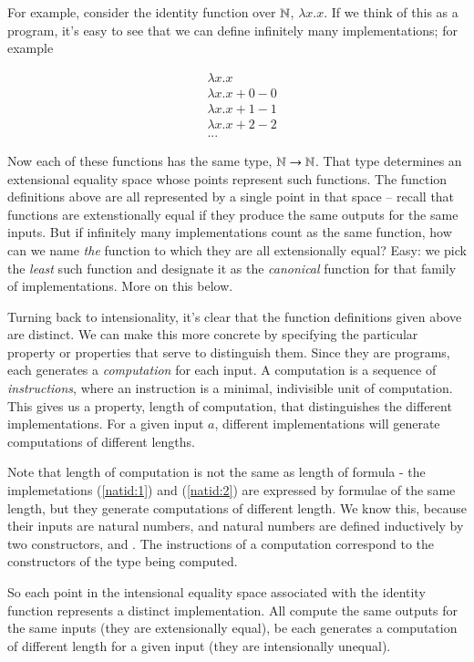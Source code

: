 For example, consider the identity function over \(\mathbb{N}\), \(\lambda
x.x\). If we think of this as a program, it's easy to see that we can
define infinitely many implementations; for example

\begin{align}
  & \lambda x.x \label{natid:lfp} \\
  & \lambda x.x + 0 - 0 \\
  & \lambda x.x + 1 - 1 \label{natid:1} \\
  & \lambda x.x + 2 - 2 \label{natid:2} \\
  & ... \nonumber
\end{align}

Now each of these functions has the same type, \(\mathbb{N}\rightarrow\mathbb{N}\). That
type determines an extensional equality space whose points represent
such functions. The function definitions above are all represented by
a single point in that space -- recall that functions are
extenstionally equal if they produce the same outputs for the same
inputs. But if infinitely many implementations count as the same
function, how can we name \textit{the} function to which they are all
extensionally equal? Easy: we pick the \textit{least} such function and
designate it as the \textit{canonical} function for that family of
implementations. More on this below.

Turning back to intensionality, it's clear that the function
definitions given above are distinct. We can make this more concrete
by specifying the particular property or properties that serve to
distinguish them. Since they are programs, each generates a
\textit{computation} for each input. A computation is a sequence of
\textit{instructions}, where an instruction is a minimal, indivisible
unit of computation. This gives us a property, length of computation,
that distinguishes the different implementations. For a given input
\(a\), different implementations will generate computations of
different lengths.

Note that length of computation is not the same as length of formula -
the implemetations (\ref{natid:1}) and (\ref{natid:2}) are expressed
by formulae of the same length, but they generate computations of
different length. We know this, because their inputs are natural
numbers, and natural numbers are defined inductively by two
constructors, \ZNat and \SNat. The instructions of a computation
correspond to the constructors of the type being computed.

So each point in the intensional equality space associated with the
identity function represents a distinct implementation. All compute
the same outputs for the same inputs (they are extensionally equal),
be each generates a computation of different length for a given input
(they are intensionally unequal).

